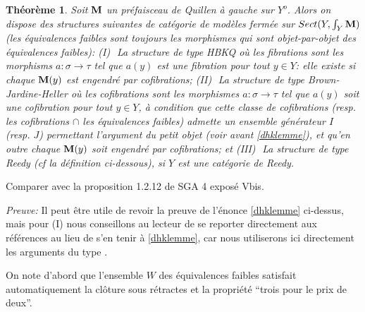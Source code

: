 \documentclass[12pt]{article}
\newtheorem{theoreme}[lemma]{Th\'eor\`eme}
\newcommand{\mm}{{\bf M}}
\begin{document}
\begin{theoreme}
\label{sectionscmf}
Soit $\mm$ un pr\'efaisceau de Quillen \`a gauche sur $Y^o$. Alors on
dispose des
structures suivantes de cat\'egorie de mod\`eles ferm\'ee sur $Sect (Y,\int
_Y\mm )$ (les \'equivalences faibles sont toujours les morphismes qui sont
objet-par-objet des \'equivalences faibles):
\newline
(I)\,\, La structure de type HBKQ o\`u les fibrations sont
les morphisms $a:\sigma \rightarrow \tau $ tel que $a(y)$ est une fibration
pour tout $y\in Y$: elle existe si chaque $\mm (y)$ est engendr\'e par
cofibrations;
\newline
(II)\,\, La structure de type Brown-Jardine-Heller o\`u les cofibrations sont
les morphismes $a:\sigma \rightarrow \tau$ tel que $a(y)$ soit une cofibration
pour tout $y\in Y$,
\`a condition que cette classe de cofibrations (resp. les cofibrations
$\cap$ les \'equivalences
faibles) admette un ensemble g\'en\'erateur $I$ (resp. $J$) permettant
l'argument du petit objet
(voir avant \ref{dhklemme}),
et qu'en outre chaque $\mm (y)$ soit engendr\'e par cofibrations; et
\newline
(III)\,\, La structure de type Reedy (cf la d\'efinition
ci-dessous),  si
$Y$ est une cat\'egorie de Reedy.
\end{theoreme}
Comparer avec
la proposition 1.2.12 de SGA 4 \cite{SGA4b} expos\'e Vbis.

\noindent
{\em Preuve:}
Il peut \^etre utile de revoir la preuve de l'\'enonce \ref{dhklemme}
ci-dessus, mais pour (I)
nous conseillons au lecteur de se reporter directement aux r\'ef\'erences
\cite{Hirschhorn} \cite{DHK} au lieu de s'en tenir \`a \ref{dhklemme}, car nous
utiliserons ici directement les arguments du type \cite{DHK}.

On note d'abord que l'ensemble $W$ des \'equivalences faibles satisfait
automatiquement la cl\^oture sous r\'etractes et la propri\'et\'e ``trois
pour le
prix de deux''.
\end{document}
